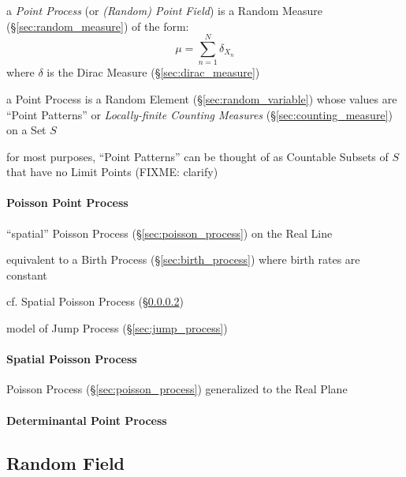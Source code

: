 a \emph{Point Process} (or \emph{(Random) Point Field}) is a Random Measure
(\S\ref{sec:random_measure}) of the form:
\[
  \mu = \sum_{n=1}^N \delta_{X_n}
\]
where $\delta$ is the Dirac Measure (\S\ref{sec:dirac_measure})

a Point Process is a Random Element (\S\ref{sec:random_variable}) whose values
are ``Point Patterns'' or \emph{Locally-finite Counting Measures}
(\S\ref{sec:counting_measure}) on a Set $S$

for most purposes, ``Point Patterns'' can be thought of as Countable Subsets of
$S$ that have no Limit Points (FIXME: clarify)



\paragraph{Poisson Point Process}\label{sec:point_poisson}\hfill

``spatial'' Poisson Process (\S\ref{sec:poisson_process}) on the Real Line

equivalent to a Birth Process (\S\ref{sec:birth_process}) where birth rates are
constant

cf. Spatial Poisson Process (\S\ref{sec:spatial_poisson})

model of Jump Process (\S\ref{sec:jump_process})



\paragraph{Spatial Poisson Process}\label{sec:spatial_poisson}\hfill

Poisson Process (\S\ref{sec:poisson_process}) generalized to the Real Plane



\paragraph{Determinantal Point Process}\label{sec:determinantal_process}\hfill



\subsection{Random Field}\label{sec:random_field}


